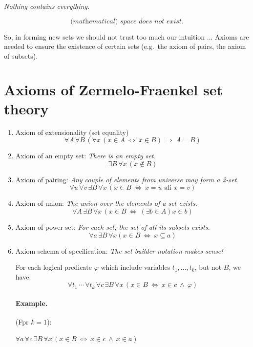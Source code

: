 \documentclass[11pt,paper=b5,footinclude,headinclude]{scrbook} %
\def\inn {{~\wedge~}}
\def\sledi {{~\Rightarrow~}}
\def\cee {{~\Leftrightarrow~}}
\theoremstyle{remark}
\theoremstyle{definition} %
\theoremstyle{theorem} %
\begin{document}
{\centerline \em Nothing contains everything.}

$$ \textit{(mathematical) space does not exist.}$$

So, in forming new sets we should not trust too much our intuition ...
Axioms are needed to ensure the existence of certain sets (e.g.~the axiom of pairs, the axiom of subsets).

\section{Axioms of Zermelo-Fraenkel set theory}

\begin{enumerate}
	\item Axiom of extensionality (set equality)
	$$\forall A\, \forall B\, (\forall x \,(x\in A \cee x\in B) \sledi A = B)$$
	
	\item Axiom of an empty set:
	\emph{ There is an empty set.}
	$$\exists B\, \forall x\, (x\not \in B)$$
	
	\item Axiom of pairing: \emph{ Any couple of elements from universe may form a 2-set.}
	$$\forall u\, \forall v\, \exists B\, \forall x\, (x\in B \cee x = u\textrm{ ali }x = v)$$
	
	\item Axiom of union: \emph{ The union over the elements of a set exists. }
	$$\forall A\, \exists B\, \forall x\, (x\in B \cee (\exists b\in A) x\in b)$$
	
	\item Axiom of power set: \emph{ For each set, the set of all its subsets exists.}
	$$\forall a\, \exists B\, \forall x (x\in B \cee x\subseteq a)$$
	
	\item Axiom schema of specification: \emph{  The set builder notation makes sense!}
	
	For each logical predicate $\varphi$ which include variables $t_1,\ldots, t_k$, but not  $B$, we have:
	$$\forall t_1\,\cdots\, \forall t_k\,\forall c\,\exists B \,\forall x \,(x\in B \cee x\in c \inn \varphi)$$
	
	\paragraph{Example.}
	(Fpr $k = 1$):
	
	$\forall a \,\forall c \,\exists B \, \forall x\, (x\in B \cee x\in c \inn x\in a)$
	

\end{enumerate}
\end{document}
